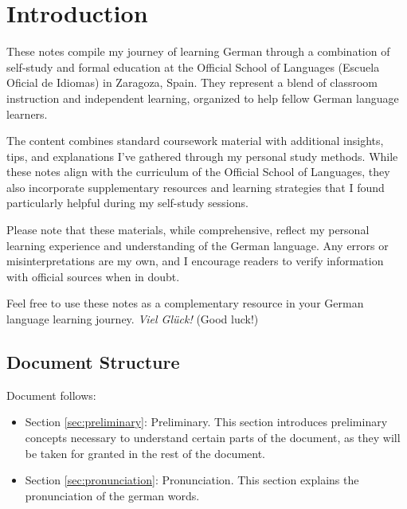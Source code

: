 \section{Introduction}\label{sec:introduction}

These notes compile my journey of learning German through a combination of self-study and formal education at the Official School of Languages (Escuela Oficial de Idiomas) in Zaragoza, Spain. They represent a blend of classroom instruction and independent learning, organized to help fellow German language learners.

The content combines standard coursework material with additional insights, tips, and explanations I've gathered through my personal study methods. While these notes align with the curriculum of the Official School of Languages, they also incorporate supplementary resources and learning strategies that I found particularly helpful during my self-study sessions.

Please note that these materials, while comprehensive, reflect my personal learning experience and understanding of the German language. Any errors or misinterpretations are my own, and I encourage readers to verify information with official sources when in doubt.

Feel free to use these notes as a complementary resource in your German language learning journey. {\em Viel Glück!} (Good luck!)

\subsection{Document Structure}

Document follows:

\begin{itemize}
    \item Section \ref{sec:preliminary}: Preliminary. This section introduces preliminary concepts necessary to understand certain parts of the document, as they will be taken for granted in the rest of the document.
    \item Section \ref{sec:pronunciation}: Pronunciation. This section explains the pronunciation of the german words.
\end{itemize}